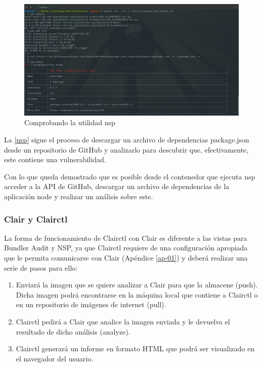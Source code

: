 \begin{figure}[htbp]
	\centering
	\includegraphics[width=1.0\linewidth]
	{desarrollo/figuras/nsp.png}
	\caption{Comprobando la utilidad nsp}
	\label{nsp}
\end{figure}

La \autoref{nsp} sigue el proceso de descargar un archivo de dependencias package.json desde un repositorio de GitHub y analizarlo para descubrir que, efectivamente, este contiene una vulnerabilidad.

Con lo que queda demostrado que es posible desde el contenedor que ejecuta nsp acceder a la \gls{API} de GitHub, descargar un archivo de dependencias de la aplicación node y realizar un análisis sobre este.

\subsubsection{Clair y Clairctl}

La forma de funcionamiento de Clairctl con Clair es diferente a las vistas para Bundler Audit y NSP, ya que Clairctl requiere de una configuración apropiada que le permita comunicarse con Clair (Apéndice \autoref{ap-01}) y deberá realizar una serie de pasos para ello:

\begin{enumerate}
	\item Enviará la imagen que se quiere analizar a Clair para que la almacene (push). Dicha imagen podrá encontrarse en la máquina local que contiene a Clairctl o en un repositorio de imágenes de internet (pull).
	\item Clairctl pedirá a Clair que analice la imagen enviada y le devuelva el resultado de dicho análisis (analyze).
	\item Clairctl generará un informe en formato HTML que podrá ser visualizado en el navegador del usuario.
\end{enumerate}

